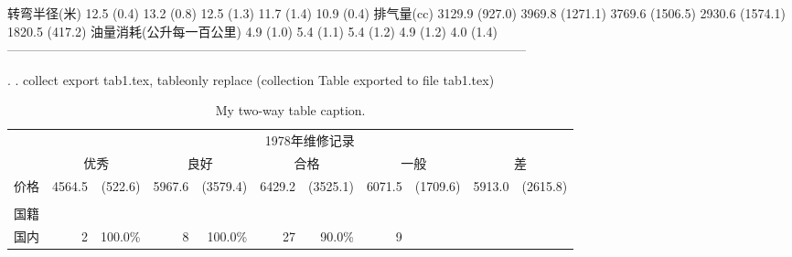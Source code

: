 \documentclass{ctexart}
\begin{document}
转弯半径(米)                12.5     (0.4)     13.2      (0.8)     12.5      (1.3)     11.7      (1.4)     10.9      (0.4)
排气量(cc)                3129.9   (927.0)   3969.8   (1271.1)   3769.6   (1506.5)   2930.6   (1574.1)   1820.5    (417.2)
油量消耗(公升每一百公里)     4.9     (1.0)      5.4      (1.1)      5.4      (1.2)      4.9      (1.2)      4.0      (1.4)
--------------------------------------------------------------------------------------------------------------------------

. 
. collect export tab1.tex, tableonly replace
(collection Table exported to file tab1.tex)

\fi


\begin{table}[H]
\centering
\caption{My two-way table caption.}
\begin{adjustbox}{width=1\textwidth}
\small
\begin{tabular}{lllllllllll}
\cline{1-11}
\multicolumn{1}{c}{} &
  \multicolumn{10}{c}{1978年维修记录} \\
\multicolumn{1}{c}{} &
  \multicolumn{2}{c}{优秀} &
  \multicolumn{2}{c}{良好} &
  \multicolumn{2}{c}{合格} &
  \multicolumn{2}{c}{一般} &
  \multicolumn{2}{c}{差} \\
\cline{1-11}
\multicolumn{1}{l}{价格} &
  \multicolumn{1}{r}{4564.5} &
  \multicolumn{1}{r}{(522.6)} &
  \multicolumn{1}{r}{5967.6} &
  \multicolumn{1}{r}{(3579.4)} &
  \multicolumn{1}{r}{6429.2} &
  \multicolumn{1}{r}{(3525.1)} &
  \multicolumn{1}{r}{6071.5} &
  \multicolumn{1}{r}{(1709.6)} &
  \multicolumn{1}{r}{5913.0} &
  \multicolumn{1}{r}{(2615.8)} \\
\multicolumn{1}{l}{} &
  \multicolumn{1}{r}{} &
  \multicolumn{1}{r}{} &
  \multicolumn{1}{r}{} &
  \multicolumn{1}{r}{} &
  \multicolumn{1}{r}{} &
  \multicolumn{1}{r}{} &
  \multicolumn{1}{r}{} &
  \multicolumn{1}{r}{} &
  \multicolumn{1}{r}{} &
  \multicolumn{1}{r}{} \\
\multicolumn{1}{l}{国籍} &
  \multicolumn{1}{r}{} &
  \multicolumn{1}{r}{} &
  \multicolumn{1}{r}{} &
  \multicolumn{1}{r}{} &
  \multicolumn{1}{r}{} &
  \multicolumn{1}{r}{} &
  \multicolumn{1}{r}{} &
  \multicolumn{1}{r}{} &
  \multicolumn{1}{r}{} &
  \multicolumn{1}{r}{} \\
\multicolumn{1}{l}{\hspace{1em}国内} &
  \multicolumn{1}{r}{2} &
  \multicolumn{1}{r}{100.0\%} &
  \multicolumn{1}{r}{8} &
  \multicolumn{1}{r}{100.0\%} &
  \multicolumn{1}{r}{27} &
  \multicolumn{1}{r}{90.0\%} &
  \multicolumn{1}{r}{9} &

\end{tabular}
\end{adjustbox}
\end{table}
\end{document}
